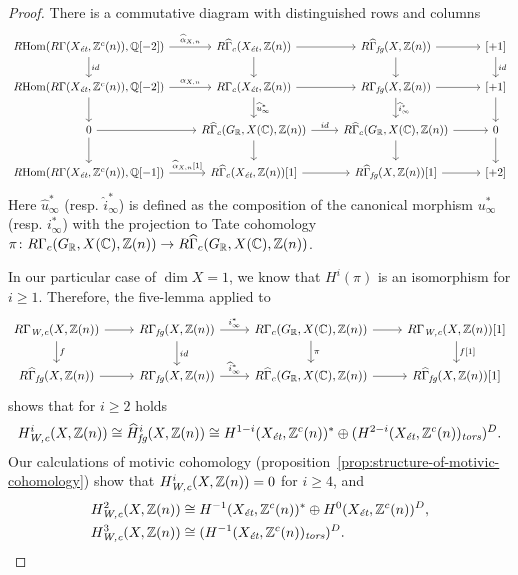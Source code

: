 \documentclass{article}
\numberwithin{equation}{section}
\begin{document}
\begin{proof}
  There is a commutative diagram with distinguished rows and columns
  \[ \begin{tikzcd}
      \RHom (R\Gamma (X_\et, \ZZ^c(n)), \QQ[-2]) \ar{r}{\widehat{\alpha}_{X,n}} \ar{d}{id} & R\widehat{\Gamma}_c (X_\et, \ZZ(n)) \ar{d} \ar{r} & R\widehat{\Gamma}_\fg (X, \ZZ(n)) \ar{r}\ar{d} & {[+1]} \ar{d}{id} \\
      \RHom (R\Gamma (X_\et, \ZZ^c(n)), \QQ[-2]) \ar{r}{\alpha_{X,n}} \ar{d} & R\Gamma_c (X_\et, \ZZ(n)) \ar{r} \ar{d}{\widehat{u}^*_\infty} & R\Gamma_\fg (X, \ZZ(n)) \ar{r} \ar{d}{\widehat{i}^*_\infty} & {[+1]} \ar{d} \\
      0 \ar{r}\ar{d} & R\widehat{\Gamma}_c (G_\RR, X(\CC), \ZZ(n)) \ar{r}{id} \ar{d} & R\widehat{\Gamma}_c (G_\RR, X(\CC), \ZZ(n)) \ar{r} \ar{d} & 0 \ar{d} \\
      \RHom (R\Gamma (X_\et, \ZZ^c(n)), \QQ[-1]) \ar{r}{\widehat{\alpha}_{X,n} [1]} & R\widehat{\Gamma}_c (X_\et, \ZZ(n)) [1] \ar{r} & R\widehat{\Gamma}_\fg (X, \ZZ(n)) [1] \ar{r} & {[+2]}
    \end{tikzcd} \]
  Here $\widehat{u}^*_\infty$ (resp. $\widehat{i}^*_\infty$)
  is defined as the composition of the canonical morphism $u^*_\infty$
  (resp. $i^*_\infty$) with the projection to Tate cohomology
  $\pi\colon R\Gamma_c (G_\RR, X(\CC), \ZZ(n)) \to
  R\widehat{\Gamma}_c (G_\RR, X(\CC), \ZZ(n))$.

  In our particular case of $\dim X = 1$, we know that $H^i (\pi)$
  is an isomorphism for $i \ge 1$. Therefore, the five-lemma applied to
  \[ \begin{tikzcd}
      R\Gamma_\Wc (X, \ZZ(n)) \ar{r}\ar{d}{f} & R\Gamma_\fg (X, \ZZ(n)) \ar{r}{i^*_\infty}\ar{d}{id} & R\Gamma_c (G_\RR, X(\CC), \ZZ(n)) \ar{r}\ar{d}{\pi} & R\Gamma_\Wc (X, \ZZ(n)) [1]\ar{d}{f [1]} \\
      R\widehat{\Gamma}_\fg (X, \ZZ(n)) \ar{r} & R\Gamma_\fg (X, \ZZ(n)) \ar{r}{\widehat{i}^*_\infty} & R\widehat{\Gamma}_c (G_\RR, X(\CC), \ZZ(n)) \ar{r} & R\widehat{\Gamma}_\fg (X, \ZZ(n)) [1]
    \end{tikzcd} \]
  shows that for $i \ge 2$ holds
  \[ H^i_\Wc (X, \ZZ(n)) \cong \widehat{H}^i_\fg (X, \ZZ(n))
    \cong H^{1-i} (X_\et, \ZZ^c(n))^*
    \oplus
    (H^{2-i} (X_\et, \ZZ^c (n))_\tors)^D. \]
  Our calculations of motivic cohomology
  (proposition~\ref{prop:structure-of-motivic-cohomology}) show that
  $H^i_\Wc (X, \ZZ(n)) = 0$ for $i \ge 4$, and
  \begin{align*}
    H^2_\Wc (X, \ZZ(n)) & \cong H^{-1} (X_\et, \ZZ^c(n))^*
                          \oplus
                          H^0 (X_\et, \ZZ^c (n))^D, \\
    H^3_\Wc (X, \ZZ(n)) & \cong (H^{-1} (X_\et, \ZZ^c (n))_\tors)^D. \qedhere
  \end{align*}
\end{proof}
\end{document}
